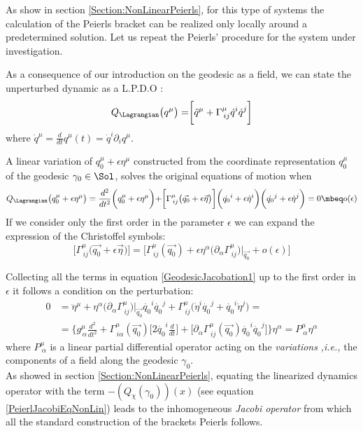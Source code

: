 \documentclass[Main]{subfiles}
\begin{document}
	As show in section \ref{Section:NonLinearPeierls}, for this type of systems the calculation of the Peierls bracket can be realized only locally around a predetermined solution.
	Let us repeat the Peierls' procedure for the system under investigation.

	As a consequence of our introduction on the geodesic as a field, we can state the unperturbed dynamic as a L.P.D.O :
		\begin{equation}
			Q_\Lagrangian \big(q^\mu 	\big)= \biggr[\ddot{q}^\mu + \Gamma^\mu_{\, i j}\dot{q}^i \dot{q}^j	\biggr]
		\end{equation}
	where $\dot{q}^\mu = \frac{d}{dt}q^\mu(t)=\dot{q}^i\partial_i q^\mu$.
	
	A linear variation of $q_0^\mu +\epsilon \eta^\mu$ constructed from the coordinate representation $q_0^\mu$ of the geodesic $\gamma_0 \in \Sol$, solves the original equations of motion when
	\begin{equation}\label{GeodesicJacobation1}
		Q_\Lagrangian \big( q_0^\mu +\epsilon \eta^\mu \big) = \frac{d^2}{dt^2}\biggr( q_0^\mu +\epsilon \eta^\mu \biggr) +
		\biggr[ \Gamma^\mu_{\, i j}\big( \vec{q_0} + \epsilon \vec{\eta}\big) \biggr]\biggr(\dot{q_0}^i +\epsilon \dot{\eta}^i \biggr)\biggr(\dot{q_0}^j +\epsilon \dot{\eta}^j \biggr) = 0 \mbeq o(\epsilon)
	\end{equation}
	If we consider only the first order in the parameter $\epsilon$ we can expand the expression of the Christoffel symbols:
	\begin{displaymath}
		\biggr[ \Gamma^\mu_{\, i j}\big( \vec{q_0} + \epsilon \vec{\eta}\big) \biggr] =
		\biggr[ \Gamma^\mu_{\, i j}( \vec{q_0}) + \epsilon \eta^\alpha\big( \partial_\alpha  \Gamma^\mu_{\, i j} \big)\biggr\vert_{\vec{q_0}} + o(\epsilon) \biggr]
	\end{displaymath}	 
	
	Collecting all the terms in equation \ref{GeodesicJacobation1} up to the first order in $\epsilon$ it follows a condition on the perturbation:
	\begin{align}\label{Eq:JacobiPeierlsEquation}
	0 &= \ddot{\eta}^\mu + \eta^\alpha\big( \partial_\alpha  \Gamma^\mu_{\, i j} \big)\biggr\vert_{\vec{q_0}} \dot{q_0}^i \dot{q_0}^j  +  \Gamma^\mu_{\, i j} \big(\dot{\eta}^i \dot{q_0}^j + \dot{q_0}^i \dot{\eta}^j \big)= \nonumber \\
	&=\biggr\{ g^\mu_{\,\alpha} \frac{d^2}{dt^2} +
	 \Gamma^\mu_{\, i \alpha}(\vec{q_0})\big[2 \dot{q_0}^i \frac{d}{dt} \big] + 
\big[ \partial_\alpha \Gamma^\mu_{\, i j}(\vec{q_0}) \dot{q_0}^i \dot{q_0}^j  \big] \biggr\} \eta^\alpha	= P^\mu_{\: \alpha} \eta^\alpha
	\end{align}		
	where $ P^\mu_{\: \alpha}$ is a linear partial differential operator acting on the \emph{variations} \textit{,i.e.,} the components of a field along the geodesic $\gamma_0$.\\
	As showed in section \ref{Section:NonLinearPeierls}, equating the linearized dynamics operator with the term $-\left(Q_\chi(\gamma_0)\right)(x)$ 	(see equation \ref{PeierlJacobiEqNonLin}) leads to the inhomogeneous \emph{Jacobi operator} from which all the standard construction of the brackets Peierls follows.
\end{document}
